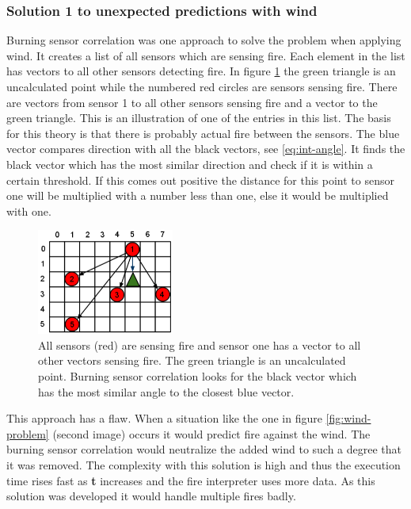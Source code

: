 \subsubsection{Solution 1 to unexpected predictions with wind}
Burning sensor correlation was one approach to solve the problem when applying wind. It creates a list of all sensors which are sensing fire. Each element in the list has vectors to all other sensors detecting fire. In figure \ref{fig:burning-sensor-correlation} the green triangle is an uncalculated point while the numbered red circles are sensors sensing fire. There are vectors from sensor 1 to all other sensors sensing fire and a vector to the green triangle. This is an illustration of one of the entries in this list. The basis for this theory is that there is probably actual fire between the sensors. The blue vector compares direction with all the black vectors, see \ref{eq:int-angle}. It finds the black vector which has the most similar direction and check if it is within a certain threshold. If this comes out positive the distance for this point to sensor one will be multiplied with a number less than one, else it would be multiplied with one.
\begin{figure}[here]
  \centering
      \includegraphics[width=0.4\textwidth]{solution/graphics/burning-sensor-correlation.png}
  \caption{All sensors (red) are sensing fire and sensor one has a vector to all other vectors sensing fire. The green triangle is an uncalculated point. Burning sensor correlation looks for the black vector which has the most similar angle to the closest blue vector.}
  \label{fig:burning-sensor-correlation}
\end{figure}
This approach has a flaw. When a situation like the one in figure \ref{fig:wind-problem} (second image) occurs it would predict fire against the wind. The burning sensor correlation would neutralize the added wind to such a degree that it was removed. The complexity with this solution is high and thus the execution time rises fast as \textbf{t} increases and the fire interpreter uses more data. As this solution was developed it would handle multiple fires badly.
